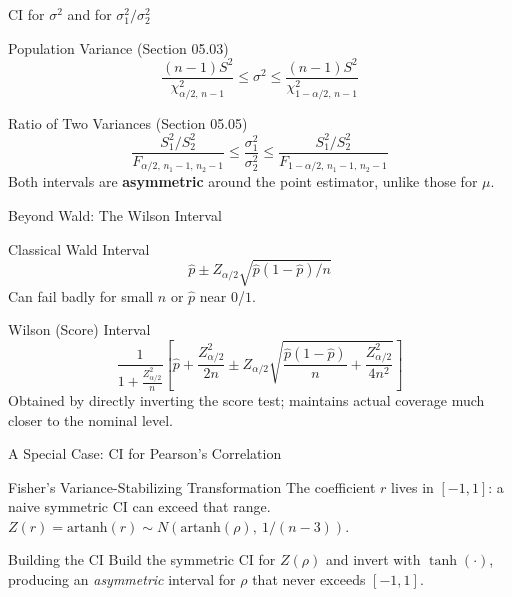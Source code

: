 \documentclass[aspectratio=169,xcolor={dvipsnames,table}]{beamer}
\begin{document}
\begin{frame}{CI for $\sigma^2$ and for $\sigma_1^2/\sigma_2^2$}
	\vspace{-0.15cm}
	\begin{block}{Population Variance (Section 05.03)}
		$$\frac{(n-1)S^2}{\chi^2_{\alpha/2,\,n-1}} \le \sigma^2 \le \frac{(n-1)S^2}{\chi^2_{1-\alpha/2,\,n-1}}$$
	\end{block}
	\pause
	\vspace{0.1cm}
	\begin{alertblock}{Ratio of Two Variances (Section 05.05)}
		$$\frac{S_1^2/S_2^2}{F_{\alpha/2,\,n_1-1,\,n_2-1}} \le \frac{\sigma_1^2}{\sigma_2^2} \le \frac{S_1^2/S_2^2}{F_{1-\alpha/2,\,n_1-1,\,n_2-1}}$$
		Both intervals are \textbf{asymmetric} around the point estimator, unlike those for $\mu$.
	\end{alertblock}
\end{frame}

\begin{frame}{Beyond Wald: The Wilson Interval}
	\vspace{-0.15cm}
	\begin{block}{Classical Wald Interval}
		$$\hat p \pm Z_{\alpha/2}\sqrt{\hat p(1-\hat p)/n}$$
		Can fail badly for small $n$ or $\hat p$ near $0$/$1$.
	\end{block}
	\pause
	\vspace{0.1cm}
	\begin{alertblock}{Wilson (Score) Interval}
		$$\frac{1}{1+\frac{Z_{\alpha/2}^2}{n}}\left[\hat p + \frac{Z_{\alpha/2}^2}{2n} \pm Z_{\alpha/2}\sqrt{\frac{\hat p(1-\hat p)}{n}+\frac{Z_{\alpha/2}^2}{4n^2}}\right]$$
		Obtained by directly inverting the score test; maintains actual coverage much closer to the nominal level.
	\end{alertblock}
\end{frame}

\begin{frame}{A Special Case: CI for Pearson's Correlation}
	\vspace{-0.15cm}
	\begin{block}{Fisher's Variance-Stabilizing Transformation}
		\footnotesize
		The coefficient $r$ lives in $[-1,1]$: a naive symmetric CI can exceed that range. $Z(r) = \text{artanh}(r) \sim N(\text{artanh}(\rho),\ 1/(n-3))$.
	\end{block}
	\pause
	\vspace{0.1cm}
	\begin{alertblock}{Building the CI}
		\footnotesize
		Build the symmetric CI for $Z(\rho)$ and invert with $\tanh(\cdot)$, producing an \emph{asymmetric} interval for $\rho$ that never exceeds $[-1,1]$.
	\end{alertblock}
\end{frame}
\end{document}
